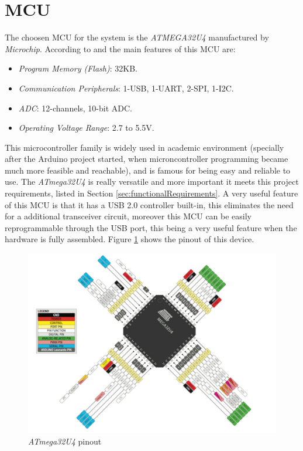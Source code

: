\section{MCU}\label{sec:mcu-hw}

	The choosen MCU for the system is the \textit{ATMEGA32U4} manufactured by \textit{Microchip}. According to \cite{atmega32u4-features} and \cite{atmega32u4-datasheet} the main features of this MCU are:
		\begin{itemize}
			\item{\textit{Program Memory (Flash)}}: 32KB.\label{itm:program-memory-flash}
			\item{\textit{Communication Peripherals}}: 1-USB, 1-UART, 2-SPI, 1-I2C.\label{itm:communication-peripherals}
			\item{\textit{ADC}}: 12-channels, 10-bit ADC.\label{itm:hw-mcu-adc}
			\item{\textit{Operating Voltage Range}}: 2.7 to 5.5V.\label{itm:operating-voltage-range}
		\end{itemize}
	\par
	This microcontroller family is widely used in academic environment (specially after the Arduino project started, when microncontroller programming became much more feasible and reachable), and is famous for being easy and reliable to use. The \textit{ATmega32U4} is really versatile and more important it meets this project requirements, listed in Section \ref{sec:functionalRequirements}. A very useful feature of this MCU is that it has a USB 2.0 controller built-in, this eliminates the need for a additional transceiver circuit, moreover this MCU can be easily reprogrammable through the USB port, this being a very useful feature when the hardware is fully assembled. Figure \ref{fig:atmega32u4-pinout} shows the pinout of this device.

	\begin{figure}[htbp]
		\centering
		\includegraphics[width=1\textwidth]{figuras/fig-atmega32u4-pinout.png}
		\caption{\textit{ATmega32U4} pinout \cite{atmega32u4-pinout}}
		\label{fig:atmega32u4-pinout}
	\end{figure}
		

